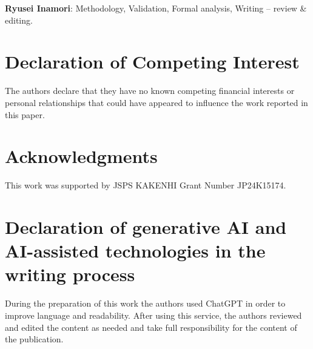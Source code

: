 \documentclass[final,1p,times]{elsarticle}
\begin{document}
\textbf{Ryusei Inamori}: Methodology, Validation, Formal analysis, Writing -- review \& editing.
\newpage
\section*{Declaration of Competing Interest}
The authors declare that they have no known competing financial interests or personal relationships that could have appeared to influence the work reported in this paper.
\newpage
\section*{Acknowledgments}
This work was supported by JSPS KAKENHI Grant Number JP24K15174.

\section*{Declaration of generative AI and AI-assisted technologies in the writing process}
During the preparation of this work the authors used ChatGPT in order to improve language and readability. After using this service, the authors reviewed and edited the content as needed and take full responsibility for the content of the publication.




\end{document}
